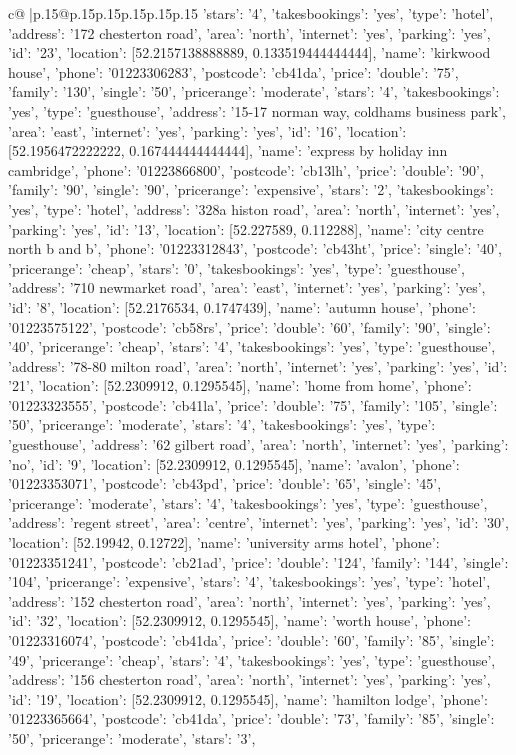 \documentclass{article}
\begin{document}
{\begin{supertabular}{c@{$\;$}|p{.15\linewidth}@{}p{.15\linewidth}p{.15\linewidth}p{.15\linewidth}p{.15\linewidth}p{.15\linewidth}}
{{{'stars': '4', 'takesbookings': 'yes', 'type': 'hotel'}, {'address': '172 chesterton road', 'area': 'north', 'internet': 'yes', 'parking': 'yes', 'id': '23', 'location': [52.2157138888889, 0.133519444444444], 'name': 'kirkwood house', 'phone': '01223306283', 'postcode': 'cb41da', 'price': {'double': '75', 'family': '130', 'single': '50'}, 'pricerange': 'moderate', 'stars': '4', 'takesbookings': 'yes', 'type': 'guesthouse'}, {'address': '15-17 norman way, coldhams business park', 'area': 'east', 'internet': 'yes', 'parking': 'yes', 'id': '16', 'location': [52.1956472222222, 0.167444444444444], 'name': 'express by holiday inn cambridge', 'phone': '01223866800', 'postcode': 'cb13lh', 'price': {'double': '90', 'family': '90', 'single': '90'}, 'pricerange': 'expensive', 'stars': '2', 'takesbookings': 'yes', 'type': 'hotel'}, {'address': '328a histon road', 'area': 'north', 'internet': 'yes', 'parking': 'yes', 'id': '13', 'location': [52.227589, 0.112288], 'name': 'city centre north b and b', 'phone': '01223312843', 'postcode': 'cb43ht', 'price': {'single': '40'}, 'pricerange': 'cheap', 'stars': '0', 'takesbookings': 'yes', 'type': 'guesthouse'}, {'address': '710 newmarket road', 'area': 'east', 'internet': 'yes', 'parking': 'yes', 'id': '8', 'location': [52.2176534, 0.1747439], 'name': 'autumn house', 'phone': '01223575122', 'postcode': 'cb58rs', 'price': {'double': '60', 'family': '90', 'single': '40'}, 'pricerange': 'cheap', 'stars': '4', 'takesbookings': 'yes', 'type': 'guesthouse'}, {'address': '78-80 milton road', 'area': 'north', 'internet': 'yes', 'parking': 'yes', 'id': '21', 'location': [52.2309912, 0.1295545], 'name': 'home from home', 'phone': '01223323555', 'postcode': 'cb41la', 'price': {'double': '75', 'family': '105', 'single': '50'}, 'pricerange': 'moderate', 'stars': '4', 'takesbookings': 'yes', 'type': 'guesthouse'}, {'address': '62 gilbert road', 'area': 'north', 'internet': 'yes', 'parking': 'no', 'id': '9', 'location': [52.2309912, 0.1295545], 'name': 'avalon', 'phone': '01223353071', 'postcode': 'cb43pd', 'price': {'double': '65', 'single': '45'}, 'pricerange': 'moderate', 'stars': '4', 'takesbookings': 'yes', 'type': 'guesthouse'}, {'address': 'regent street', 'area': 'centre', 'internet': 'yes', 'parking': 'yes', 'id': '30', 'location': [52.19942, 0.12722], 'name': 'university arms hotel', 'phone': '01223351241', 'postcode': 'cb21ad', 'price': {'double': '124', 'family': '144', 'single': '104'}, 'pricerange': 'expensive', 'stars': '4', 'takesbookings': 'yes', 'type': 'hotel'}, {'address': '152 chesterton road', 'area': 'north', 'internet': 'yes', 'parking': 'yes', 'id': '32', 'location': [52.2309912, 0.1295545], 'name': 'worth house', 'phone': '01223316074', 'postcode': 'cb41da', 'price': {'double': '60', 'family': '85', 'single': '49'}, 'pricerange': 'cheap', 'stars': '4', 'takesbookings': 'yes', 'type': 'guesthouse'}, {'address': '156 chesterton road', 'area': 'north', 'internet': 'yes', 'parking': 'yes', 'id': '19', 'location': [52.2309912, 0.1295545], 'name': 'hamilton lodge', 'phone': '01223365664', 'postcode': 'cb41da', 'price': {'double': '73', 'family': '85', 'single': '50'}, 'pricerange': 'moderate', 'stars': '3', }}}
\end{supertabular}}
\end{document}
